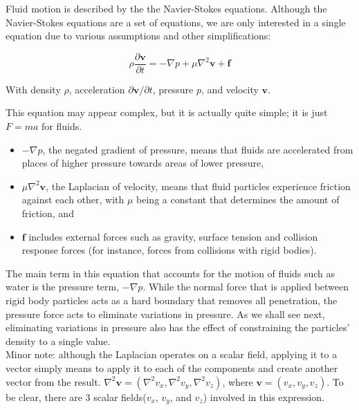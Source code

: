 \documentclass[]{article}
\begin{document}
	Fluid motion is described by the the Navier-Stokes equations. Although the Navier-Stokes equations are a set of
	equations, we are only interested in a single equation due to various assumptions and other simplifications:
	
	\begin{equation}
		\rho \frac{\partial \mathbf{v}}{\partial t} = - \nabla p + \mu \nabla ^2 \mathbf{v} + \mathbf{f}
	\end{equation}

	With density \( \rho \), acceleration \( \partial \mathbf{v} / \partial t \), pressure \( p \), and velocity 
	\( \mathbf{v} \).
	
	This equation may appear complex, but it is actually quite simple; it is just \(F = ma\) for fluids.
	\begin{itemize}
		\item \(- \nabla p\), the negated gradient of pressure, means that fluids are accelerated from 
		places of higher pressure towards areas of lower pressure,
		\item \(\mu \nabla ^2 \mathbf{v}\), the Laplacian of velocity, means that fluid particles experience friction 
		against each other, with \(\mu\) being a constant that determines the amount of friction, and
		\item \(\mathbf{f}\) includes external forces such as gravity, surface tension and collision response forces
		 (for instance, forces from collisions with rigid bodies).
	\end{itemize}
	
	The main term in this equation that accounts for the motion of fluids such as water is the pressure term, 
	\(- \nabla p\). While the normal force that is applied between rigid body particles acts as a hard boundary that
	removes all penetration, the pressure force acts to eliminate variations in pressure. As we shall see next, 
	eliminating variations in pressure also has the effect of constraining the particles' density to a single value.\\
	
	Minor note: although the Laplacian operates on a scalar field, applying it to a vector simply means to apply it to
	each of the components and create another vector from the result. 
	\(\nabla ^2 \mathbf{v} = (\nabla ^2 v_x, \nabla ^2 v_y, \nabla ^2 v_z) \), where \(\mathbf{v} = (v_x, v_y, v_z)\).
	To be clear, there are 3 scalar fields(\(v_x\), \(v_y\), and \(v_z\)) involved in this expression.\\
	
\end{document}
